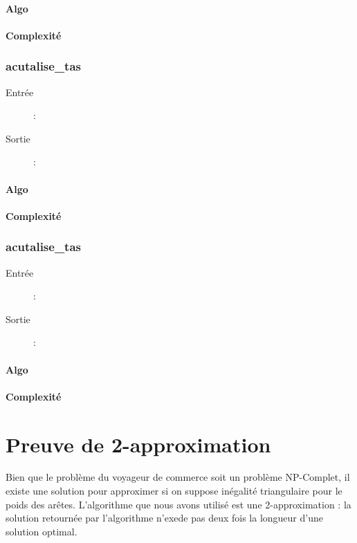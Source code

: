 \documentclass[a4paper,11pt]{article}
\begin{document}
\paragraph*{Algo}
\paragraph*{Complexité}

\subsubsection*{acutalise\_tas}
\begin{description}
\item[Entrée] : 
\item[Sortie] : 
\end{description}
\paragraph*{Algo}
\paragraph*{Complexité}

\subsubsection*{acutalise\_tas}
\begin{description}
\item[Entrée] : 
\item[Sortie] : 
\end{description}
\paragraph*{Algo}
\paragraph*{Complexité}


\section{Preuve de 2-approximation} %
Bien que le problème du voyageur de commerce soit un problème NP-Complet, il existe une solution pour approximer si on suppose inégalité triangulaire pour le poids des arêtes. L'algorithme que nous avons utilisé est une 2-approximation : la solution retournée par l'algorithme n'exede pas deux fois la longueur d'une solution optimal.
\end{document}
